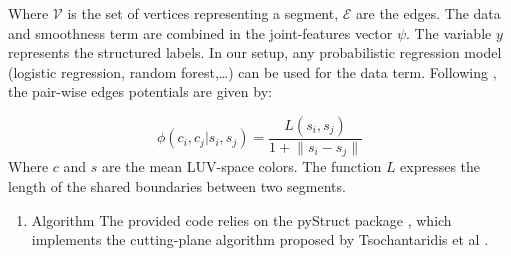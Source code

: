 \documentclass[10pt,conference,compsocconf]{IEEEtran}
\begin{document}
Where \(\mathcal{V}\) is the set of vertices representing a segment, \(\mathcal{E}\) are the edges. The data and smoothness term are combined in the joint-features vector \(\psi\). The variable \(y\) represents the structured labels. In our setup, any probabilistic regression model (logistic regression, random forest,\ldots{}) can be used for the data term. Following \cite{fulkerson09}, the pair-wise edges potentials are given by:

 \begin{equation}
\phi(c_i,c_j|s_i,s_j) = \frac{L(s_i,s_j)}{1+\lVert s_i - s_j \rVert}
 \end{equation}
Where \(c\) and \(s\) are the mean LUV-space colors. The function \(L\) expresses the length of the shared boundaries between two segments.
\begin{enumerate}
\item Algorithm
\label{sec:orgheadline10}
The provided code relies on the pyStruct package \cite{muller14}, which implements the cutting-plane algorithm proposed by Tsochantaridis et al \cite{tsochantaridis05}.
\end{enumerate}
\end{document}
